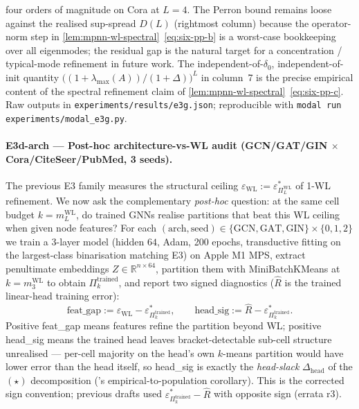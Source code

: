 \documentclass[10pt]{article}
\theoremstyle{definition}
\theoremstyle{remark}
\newcommand{\eps}{\varepsilon}
\begin{document}
\begin{table}[h]
{four orders of magnitude on Cora at $L=4$. The Perron bound
remains loose against the realised sup-spread $D(L)$ (rightmost
column) because the operator-norm step in
\cref{lem:mpnn-wl-spectral}~\eqref{eq:six-pp-b} is a worst-case
bookkeeping over all eigenmodes; the residual gap is the natural
target for a concentration / typical-mode refinement in future
work. The independent-of-$\delta_{0}$, independent-of-init
quantity $\bigl((1{+}\lambda_{\max}(A))/(1{+}\Delta)\bigr)^{L}$
in column~7 is the precise empirical content of the spectral
refinement claim of
\cref{lem:mpnn-wl-spectral}~\eqref{eq:six-pp-c}. Raw outputs in
\texttt{experiments/results/e3g.json}; reproducible with
\texttt{modal run experiments/modal\_e3g.py}.}
\label{tab:e3g}
\end{table}

\paragraph{E3d-arch --- Post-hoc architecture-vs-WL audit
(GCN/GAT/GIN $\times$ Cora/CiteSeer/PubMed, 3 seeds).}
The previous E3 family measures the structural ceiling
$\eps_{\mathrm{WL}} := \eps^{*}_{\Pi^{\mathrm{WL}}_{L}}$
of 1-WL refinement. We now ask the complementary
\emph{post-hoc} question: at the same cell budget $k = m^{\mathrm{WL}}_{L}$,
do trained GNNs realise partitions that beat this WL ceiling
when given node features?  For each
$(\text{arch}, \text{seed}) \in \{\mathrm{GCN}, \mathrm{GAT}, \mathrm{GIN}\}
\times \{0,1,2\}$ we train a 3-layer model (hidden $64$, Adam, 200
epochs, transductive fitting on the largest-class binarisation
matching E3) on Apple M1 MPS, extract penultimate embeddings
$Z \in \mathbb{R}^{n \times 64}$, partition them with
MiniBatchKMeans at $k = m^{\mathrm{WL}}_{3}$ to obtain
$\Pi^{\mathrm{trained}}_{k}$, and report two signed diagnostics
($\hat R$ is the trained linear-head training error):
\[
\text{feat\_gap} := \eps_{\mathrm{WL}} - \eps^{*}_{\Pi^{\mathrm{trained}}_{k}},
\qquad
\text{head\_sig} := \hat R - \eps^{*}_{\Pi^{\mathrm{trained}}_{k}} .
\]
Positive feat\_gap means features refine the partition beyond WL;
positive head\_sig means the trained head leaves bracket-detectable
sub-cell structure unrealised --- per-cell majority on the head's
own $k$-means partition would have lower error than the head itself,
so head\_sig is exactly the \emph{head-slack} $\Delta_{\mathrm{head}}$
of the $(\star)$ decomposition ('s
empirical-to-population corollary). This is the corrected sign
convention; previous drafts used $\eps^{*}_{\Pi^{\mathrm{trained}}_{k}} - \hat R$
with opposite sign (errata r3).
\end{document}
